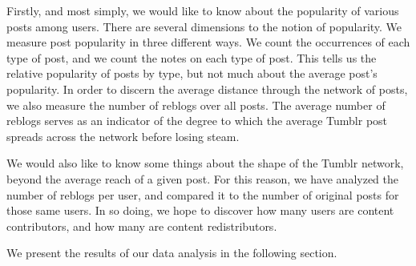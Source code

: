 Firstly, and most simply, we would like to know about the popularity of 
various posts among users.  There are several dimensions to the notion 
of popularity.  We measure post popularity in three different ways.  
We count the occurrences of each type of post, and we count the notes 
on each type of post.  This tells us the relative popularity of posts 
by type, but not much about the average post's popularity.  In order 
to discern the average distance through the network of posts, we also 
measure the number of reblogs over all posts.  The average number of 
reblogs serves as an indicator of the degree to which the average 
Tumblr post spreads across the network before losing steam.


We would also like to know some things about the shape of the Tumblr 
network, beyond the average reach of a given post.  For this reason, 
we have analyzed the number of reblogs per user, and compared it to 
the number of original posts for those same users.  In so doing, we 
hope to discover how many users are content contributors, and how 
many are content redistributors. 

We present the results of our data analysis in the following section.


